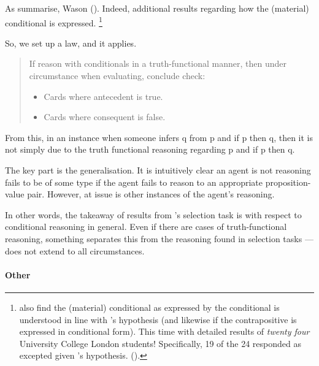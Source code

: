 \begin{note}
  As \citeauthor{Johnson-Laird:1969aa} summarise, Wason  (\citeyear[367]{Johnson-Laird:1969aa}).
  Indeed, \citeauthor{Johnson-Laird:1969aa} additional results regarding how the (material) conditional is expressed.%
  \footnote{
    \citeauthor{Johnson-Laird:1969aa} also find the (material) conditional as expressed by the conditional is understood in line with \citeauthor{Wason:1966aa}'s hypothesis (and likewise if the contrapositive is expressed in conditional form).
    This time with detailed results of \emph{twenty four} University College London students!
    Specifically, 19 of the 24 responded as excepted given \citeauthor{Wason:1966aa}'s hypothesis.
    (\citeyear[369,370]{Johnson-Laird:1969aa}).
  }
\end{note}

\begin{note}
  So, we set up a law, and it applies.

  \begin{quote}
    If reason with conditionals in a truth-functional manner, then under circumstance when evaluating, conclude check:
    \begin{itemize}[noitemsep]
    \item
      Cards where antecedent is true.
    \item
      Cards where consequent is false.
    \end{itemize}
  \end{quote}

  From this, in an instance when someone infers q from p and if p then q, then it is not simply due to the truth functional reasoning regarding p and if p then q.

  The key part is the generalisation.
  It is intuitively clear an agent is not reasoning fails to be of some type if the agent fails to reason to an appropriate proposition-value pair.
  However, at issue is other instances of the agent's reasoning.

  In other words, the takeaway of results from \citeauthor{Wason:1966aa}'s selection task is with respect to conditional reasoning in general.
  Even if there are cases of truth-functional reasoning, something separates this from the reasoning found in selection tasks --- does not extend to all circumstances.
\end{note}

\paragraph*{Other}

